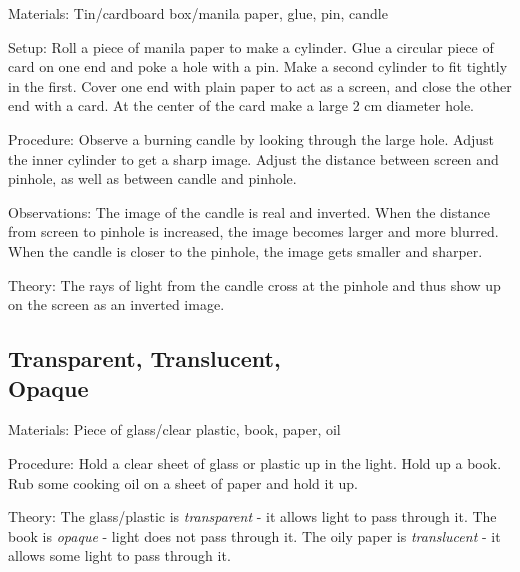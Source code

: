 \begin{multicols}{2}
\begin{description*}
\item[Materials:]{Tin/cardboard box/manila paper, glue, pin, candle}
\item[Setup:]{Roll a piece of manila paper to make a cylinder. Glue a circular piece of card on one end and poke a hole with a pin. Make a second cylinder to fit tightly in the first. Cover one end with plain paper to act as a screen, and close the other end with a card. At the center of the card make a large 2 cm diameter hole.}
\item[Procedure:]{Observe a burning candle by looking through the large hole. Adjust the inner cylinder to get a sharp image. Adjust the distance between screen and pinhole, as well as between candle and pinhole.}
\item[Observations:]{The image of the candle is real and inverted. When the distance from screen to pinhole is increased, the image becomes larger and more blurred. When the candle is closer to the pinhole, the image gets smaller and sharper.}
\item[Theory:]{The rays of light from the candle cross at the pinhole and thus show up on the screen as an inverted image.}
\end{description*}

\subsection[Transparent, Translucent, Opaque]{Transparent, Translucent, \hfill \\ Opaque}


\begin{description*}
\item[Materials:]{Piece of glass/clear plastic, book, paper, oil}
\item[Procedure:]{Hold a clear sheet of glass or plastic up in the light. Hold up a book. Rub some cooking oil on a sheet of paper and hold it up.}
\item[Theory:]{The glass/plastic is \emph{transparent} - it allows light to pass through it. The book is \emph{opaque} - light does not pass through it. The oily paper is \emph{translucent} - it allows some light to pass through it.}
\end{description*}


\end{multicols}
